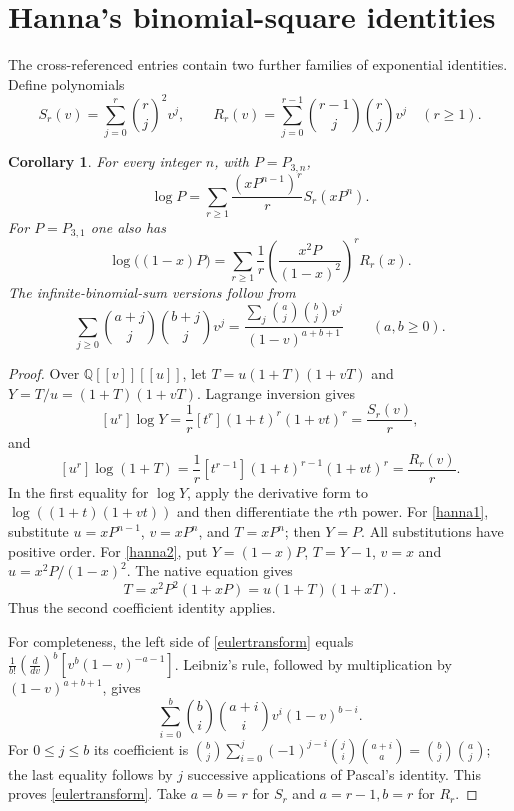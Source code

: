 \documentclass[11pt]{article}
\newtheorem{corollary}[theorem]{Corollary}
\newcommand{\coef}[2]{[#1^{#2}]}
\begin{document}
\section{Hanna's binomial-square identities}
The cross-referenced entries contain two further families of exponential
identities. Define polynomials
\[
 S_r(v)=\sum_{j=0}^r\binom rj^2v^j,\qquad
 R_r(v)=\sum_{j=0}^{r-1}\binom{r-1}j\binom rj v^j\quad(r\geq1).
\]
\begin{corollary}\label{hanna}
For every integer $n$, with $P=P_{3,n}$,
\begin{equation}\label{hanna1}
 \log P=\sum_{r\geq1}\frac{(xP^{n-1})^r}{r}S_r(xP^n).
\end{equation}
For $P=P_{3,1}$ one also has
\begin{equation}\label{hanna2}
 \log\bigl((1-x)P\bigr)
 =\sum_{r\geq1}\frac1r\left(\frac{x^2P}{(1-x)^2}\right)^rR_r(x).
\end{equation}
The infinite-binomial-sum versions follow from
\begin{equation}\label{eulertransform}
 \sum_{j\geq0}\binom{a+j}j\binom{b+j}jv^j
 =\frac{\sum_j\binom aj\binom bjv^j}{(1-v)^{a+b+1}}
 \qquad(a,b\geq0).
\end{equation}
\end{corollary}
\begin{proof}
Over $\mathbb Q[[v]][[u]]$, let $T=u(1+T)(1+vT)$ and
$Y=T/u=(1+T)(1+vT)$. Lagrange inversion gives
\[
 \coef{u}{r}\log Y=\frac1r\coef{t}{r}(1+t)^r(1+vt)^r
 =\frac{S_r(v)}r,
\]
and
\[
 \coef{u}{r}\log(1+T)
 =\frac1r\coef{t}{r-1}(1+t)^{r-1}(1+vt)^r
 =\frac{R_r(v)}r.
\]
In the first equality for $\log Y$, apply the derivative form to
$\log((1+t)(1+vt))$ and then differentiate the $r$th power.
For \eqref{hanna1}, substitute $u=xP^{n-1}$, $v=xP^n$, and $T=xP^n$;
then $Y=P$. All substitutions have positive order.
For \eqref{hanna2}, put $Y=(1-x)P$, $T=Y-1$, $v=x$ and
$u=x^2P/(1-x)^2$. The native equation gives
\[
 T=x^2P^2(1+xP)=u(1+T)(1+xT).
\]
Thus the second coefficient identity applies.

For completeness, the left side of \eqref{eulertransform} equals
$\frac1{b!}(\frac{d}{dv})^b[v^b(1-v)^{-a-1}]$.
Leibniz's rule, followed by multiplication by $(1-v)^{a+b+1}$, gives
\[
 \sum_{i=0}^b\binom bi\binom{a+i}i v^i(1-v)^{b-i}.
\]
For $0\leq j\leq b$ its coefficient is
$\binom bj\sum_{i=0}^j(-1)^{j-i}\binom ji\binom{a+i}a
=\binom bj\binom aj$; the last equality follows by $j$ successive
applications of Pascal's identity. This proves \eqref{eulertransform}.
Take $a=b=r$ for $S_r$ and $a=r-1,b=r$ for $R_r$.
\end{proof}
\end{document}
